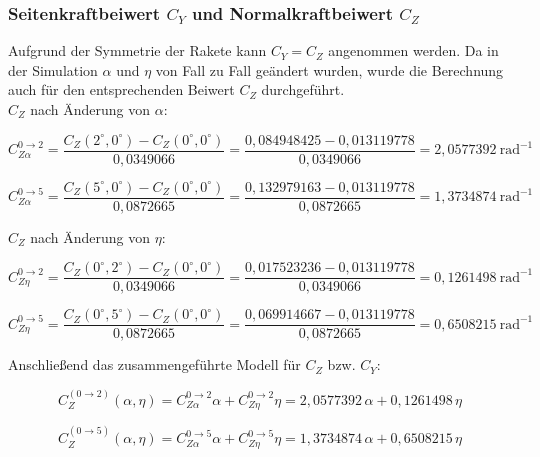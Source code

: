 \subsubsection*{Seitenkraftbeiwert $C_Y$ und Normalkraftbeiwert $C_Z$}
\label{subsubsec:c_y_z_calculation}
Aufgrund der Symmetrie der Rakete kann $C_Y = C_Z$ angenommen werden. Da in der Simulation $\alpha$ und $\eta$ von Fall zu Fall geändert wurden, wurde die Berechnung auch für den entsprechenden Beiwert $C_Z$ durchgeführt.
\\
$C_Z$ nach Änderung von $\alpha$:

\begin{equation}
C_{Z\alpha}^{0\to2}
= \frac{C_Z(2^\circ,0^\circ)-C_Z(0^\circ,0^\circ)}{0{,}0349066}
= \frac{0{,}084948425-0{,}013119778}{0{,}0349066}
= 2{,}0577392\ \mathrm{rad^{-1}}
\end{equation}

\begin{equation}
C_{Z\alpha}^{0\to5}
= \frac{C_Z(5^\circ,0^\circ)-C_Z(0^\circ,0^\circ)}{0{,}0872665}
= \frac{0{,}132979163-0{,}013119778}{0{,}0872665}
= 1{,}3734874\ \mathrm{rad^{-1}}
\end{equation}

$C_Z$ nach Änderung von $\eta$:

\begin{equation}
C_{Z\eta}^{0\to2}
= \frac{C_Z(0^\circ,2^\circ)-C_Z(0^\circ,0^\circ)}{0{,}0349066}
= \frac{0{,}017523236-0{,}013119778}{0{,}0349066}
= 0{,}1261498\ \mathrm{rad^{-1}}
\end{equation}

\begin{equation}
C_{Z\eta}^{0\to5}
= \frac{C_Z(0^\circ,5^\circ)-C_Z(0^\circ,0^\circ)}{0{,}0872665}
= \frac{0{,}069914667-0{,}013119778}{0{,}0872665}
= 0{,}6508215\ \mathrm{rad^{-1}}
\end{equation}

Anschließend das zusammengeführte Modell für $C_Z$ bzw. $C_Y$:

\begin{equation}
C_Z^{(0\to2)}(\alpha,\eta)
= C_{Z\alpha}^{0\to2}\alpha + C_{Z\eta}^{0\to2}\eta
= 2{,}0577392\,\alpha + 0{,}1261498\,\eta
\end{equation}

\begin{equation}
C_Z^{(0\to5)}(\alpha,\eta)
= C_{Z\alpha}^{0\to5}\alpha + C_{Z\eta}^{0\to5}\eta
= 1{,}3734874\,\alpha + 0{,}6508215\,\eta
\end{equation}

